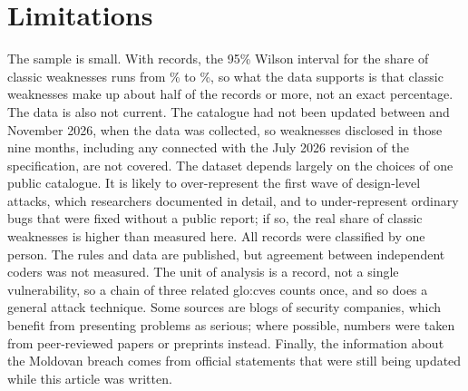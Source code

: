 \section{Limitations}
\label{sec:validity}

\par The sample is small. With \nRecords{} records, the 95\% Wilson interval for the share of classic weaknesses runs from \ciClassicLow\% to \ciClassicHigh\%, so what the data supports is that classic weaknesses make up about half of the records or more, not an exact percentage. The data is also not current. The catalogue had not been updated between \lastDisclosure{} and November 2026, when the data was collected, so weaknesses disclosed in those nine months, including any connected with the July 2026 revision of the specification, are not covered. The dataset depends largely on the choices of one public catalogue. It is likely to over-represent the first wave of design-level attacks, which researchers documented in detail, and to under-represent ordinary bugs that were fixed without a public report; if so, the real share of classic weaknesses is higher than measured here. All records were classified by one person. The rules and data are published, but agreement between independent coders was not measured. The unit of analysis is a record, not a single vulnerability, so a chain of three related \acrshort{glo:cve}s counts once, and so does a general attack technique. Some sources are blogs of security companies, which benefit from presenting problems as serious; where possible, numbers were taken from peer-reviewed papers or preprints instead. Finally, the information about the Moldovan breach comes from official statements that were still being updated while this article was written.
